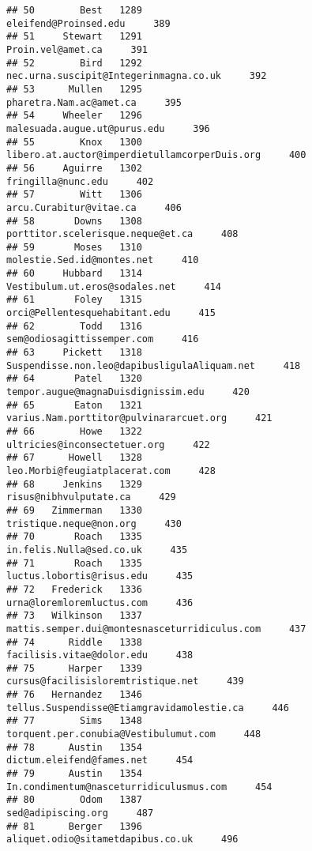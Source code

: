 \documentclass[
]{article}
\begin{document}
\begin{verbatim}
## 50        Best   1289                             eleifend@Proinsed.edu     389
## 51     Stewart   1291                                 Proin.vel@amet.ca     391
## 52        Bird   1292            nec.urna.suscipit@Integerinmagna.co.uk     392
## 53      Mullen   1295                           pharetra.Nam.ac@amet.ca     395
## 54     Wheeler   1296                      malesuada.augue.ut@purus.edu     396
## 55        Knox   1300     libero.at.auctor@imperdietullamcorperDuis.org     400
## 56     Aguirre   1302                                fringilla@nunc.edu     402
## 57        Witt   1306                           arcu.Curabitur@vitae.ca     406
## 58       Downs   1308                 porttitor.scelerisque.neque@et.ca     408
## 59       Moses   1310                        molestie.Sed.id@montes.net     410
## 60     Hubbard   1314                    Vestibulum.ut.eros@sodales.net     414
## 61       Foley   1315                     orci@Pellentesquehabitant.edu     415
## 62        Todd   1316                        sem@odiosagittissemper.com     416
## 63     Pickett   1318      Suspendisse.non.leo@dapibusligulaAliquam.net     418
## 64       Patel   1320               tempor.augue@magnaDuisdignissim.edu     420
## 65       Eaton   1321           varius.Nam.porttitor@pulvinararcuet.org     421
## 66        Howe   1322                      ultricies@inconsectetuer.org     422
## 67      Howell   1328                     leo.Morbi@feugiatplacerat.com     428
## 68     Jenkins   1329                            risus@nibhvulputate.ca     429
## 69   Zimmerman   1330                           tristique.neque@non.org     430
## 70       Roach   1335                          in.felis.Nulla@sed.co.uk     435
## 71       Roach   1335                         luctus.lobortis@risus.edu     435
## 72   Frederick   1336                         urna@loremloremluctus.com     436
## 73   Wilkinson   1337     mattis.semper.dui@montesnasceturridiculus.com     437
## 74      Riddle   1338                         facilisis.vitae@dolor.edu     438
## 75      Harper   1339                cursus@facilisisloremtristique.net     439
## 76   Hernandez   1346        tellus.Suspendisse@Etiamgravidamolestie.ca     446
## 77        Sims   1348             torquent.per.conubia@Vestibulumut.com     448
## 78      Austin   1354                         dictum.eleifend@fames.net     454
## 79      Austin   1354           In.condimentum@nasceturridiculusmus.com     454
## 80        Odom   1387                                sed@adipiscing.org     487
## 81      Berger   1396                 aliquet.odio@sitametdapibus.co.uk     496

\end{verbatim}
\end{document}
